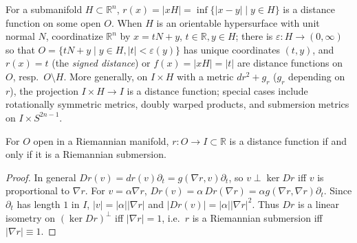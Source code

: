 \begin{example}[Example 3.2.7]
  \label{ex:pet-ch3-distance-to-submanifold}
  \leanok
  For a submanifold $H\subset\mathbb R^n$, $r(x)=|xH|=\inf\{|x-y|\mid y\in H\}$ is
  a distance function on some open $O$. When $H$ is an orientable hypersurface
  with unit normal $N$, coordinatize $\mathbb R^n$ by $x=tN+y$, $t\in\mathbb
  R,y\in H$; there is $\varepsilon:H\to(0,\infty)$ so that
  $O=\{tN+y\mid y\in H,|t|<\varepsilon(y)\}$ has unique coordinates $(t,y)$, and
  $r(x)=t$ (the \emph{signed distance}) or $f(x)=|xH|=|t|$ are distance functions
  on $O$, resp.\ $O\setminus H$. More generally, on $I\times H$ with a metric
  $dr^2+g_r$ ($g_r$ depending on $r$), the projection $I\times H\to I$ is a
  distance function; special cases include rotationally symmetric metrics,
  doubly warped products, and submersion metrics on $I\times S^{2n-1}$.
\end{example}

\begin{lemma}[Lemma 3.2.8]
  \label{lem:pet-ch3-distance-function-submersion}
  \leanok
  For $O$ open in a Riemannian manifold, $r:O\to I\subset\mathbb R$ is a distance
  function if and only if it is a Riemannian submersion.
\end{lemma}
\begin{proof}
  \leanok
  In general $Dr(v)=dr(v)\partial_t=g(\nabla r,v)\partial_t$, so $v\perp\ker Dr$
  iff $v$ is proportional to $\nabla r$. For $v=\alpha\nabla r$,
  $Dr(v)=\alpha\,Dr(\nabla r)=\alpha g(\nabla r,\nabla r)\partial_t$. Since
  $\partial_t$ has length $1$ in $I$, $|v|=|\alpha||\nabla r|$ and
  $|Dr(v)|=|\alpha||\nabla r|^2$. Thus $Dr$ is a linear isometry on
  $(\ker Dr)^\perp$ iff $|\nabla r|=1$, i.e.\ $r$ is a Riemannian submersion iff
  $|\nabla r|\equiv1$.
\end{proof}

